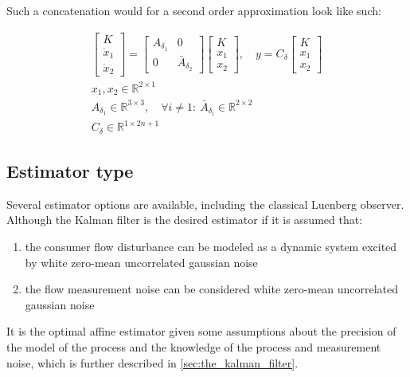 Such a concatenation would for a second order approximation look like such:

\begin{equation}\label{eq:DisturbanceVectorCase}
	\begin{gathered}
		\begin{bmatrix} K \\ \dot{x}_1 \\ \dot{x}_2 \end{bmatrix} = \begin{bmatrix} A_{\delta_1} & 0 \\ 0 & \bar{A}_{\delta_2} \end{bmatrix} \begin{bmatrix} K \\ x_1 \\ x_2 \end{bmatrix},
		\quad y = C_\delta \begin{bmatrix} K \\ x_1 \\ x_2 \end{bmatrix} \\
		x_1, x_2 \in \mathbb{R}^{2\times1} \\
		A_{\delta_1} \in \mathbb{R}^{3\times3}, \quad \forall i \neq 1: \ \bar{A}_{\delta_i} \in \mathbb{R}^{2\times2} \\
		C_\delta \in \mathbb{R}^{1\times2n+1}
	\end{gathered}
\end{equation}

\subsection{Estimator type}
Several estimator options are available, including the classical Luenberg observer. Although the Kalman filter is the desired estimator if it is assumed that:

\begin{enumerate}
	\item the consumer flow disturbance can be modeled as a dynamic system excited by white zero-mean uncorrelated gaussian noise
	\item the flow measurement noise can be considered white zero-mean uncorrelated gaussian noise
\end{enumerate}

It is the optimal affine estimator given some assumptions about the precision of the model of the process and the knowledge of the process and measurement noise, which is further described in \cref{sec:the_kalman_filter}.





